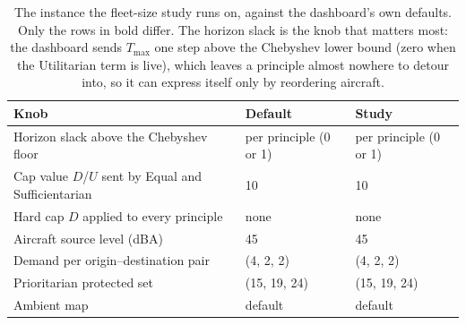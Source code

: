 \begin{table}[t]
\centering
\caption{The instance the fleet-size study runs on, against the dashboard's own defaults. Only the rows in bold differ. The horizon slack is the knob that matters most: the dashboard sends $T_{\max}$ one step above the Chebyshev lower bound (zero when the Utilitarian term is live), which leaves a principle almost nowhere to detour into, so it can express itself only by reordering aircraft.}
\label{tab:setup}
\begin{tabular}{l l l}
\toprule
Knob & Default & Study \\
\midrule
Horizon slack above the Chebyshev floor & per principle (0 or 1) & per principle (0 or 1) \\
Cap value $D$/$U$ sent by Equal and Sufficientarian & 10 & 10 \\
Hard cap $D$ applied to every principle & none & none \\
Aircraft source level (dBA) & 45 & 45 \\
Demand per origin--destination pair & (4, 2, 2) & (4, 2, 2) \\
Prioritarian protected set & (15, 19, 24) & (15, 19, 24) \\
Ambient map & default & default \\
\bottomrule
\end{tabular}
\end{table}
